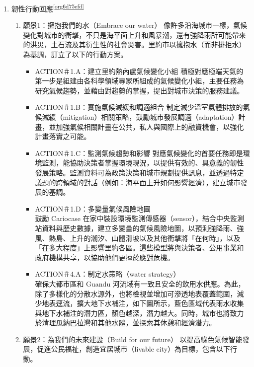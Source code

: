 \documentclass[a4paper,12pt]{article}
\begin{document}
\begin{enumerate}
\item 韌性行動回應\textsuperscript{\ref{org6d75efd}}
\label{sec:org6b37bef}
\begin{enumerate}
\item 願景1：擁抱我們的水（Embrace our water）
\label{sec:org4407444}
像許多沿海城市一樣，氣候變化對城市的衝擊，不只是海平面上升和風暴潮，還有強降雨所可能帶來的洪災，土石流及其衍生性的社會災害。里約市以擁抱水（而非排拒水）為基調，訂立了以下的行動方案。\\
\begin{itemize}
\item ACTION＃1.A：建立里約熱內盧氣候變化小組  積極對應極端天氣的第一步是組建由各科學領域專家所組成的氣候變化小組，主要任務為研究氣候趨勢，並藉由對趨勢的掌握，提出對城市決策的服務建議。\\
\item ACTION＃1.B：實施氣候減緩和調適組合  制定減少溫室氣體排放的氣候減緩（mitigation）相關策略，鼓勵城市發展調適（adaptation）計畫，並加強氣候相關計畫在公共，私人與國際上的融資機會，以強化計畫落實之可能。\\
\item ACTION＃1.C：監測氣候趨勢和影響  對應氣候變化的首要任務即是環境監測，能協助決策者掌握環境現況，以提供有效的、具意義的韌性發展策略。監測資料可為政策決策和城市規劃提供訊息，並透過特定議題的跨領域的對話（例如：海平面上升如何影響經濟），建立城市發展的基調。\\
\item ACTION＃1.D：多變量氣候風險地圖\\
鼓勵 Cariocase 在家中裝設環境監測傳感器（sensor），結合中央監測站資料與歷史數據，建立多變量的氣候風險地圖，以預測強降雨、強風、熱島、上升的潮汐、山體滑坡以及其他衝擊將「在何時」，以及「在多大程度」上影響里約各區。這些模型將與決策者、公用事業和政府機構共享，以協助他們更擅於應對危機。\\
\item ACTION＃4.A：制定水策略（water strategy）\\
確保大都市區和 Guandu 河流域有一致且安全的飲用水供應。為此，除了多樣化的分散水源外，也將檢視並增加可滲透地表覆蓋範圍，減少地表逕流，擴大地下水補注，如下圖所示，藍色區域代表雨水收集與地下水補注的潛力區，顏色越深，潛力越大。同時，城市也將致力於清理瓜納巴拉灣和其他水體，並探索其休憩和經濟潛力。\\
\end{itemize}
\item 願景2：為我們的未來建設（Build for our future）
\label{sec:org3a1b496}
以提高綠色氣候智能發展，促進公民福祉，創造宜居城市（livable city）為目標，包含以下行動。\\

\end{enumerate}
\end{enumerate}
\end{document}
